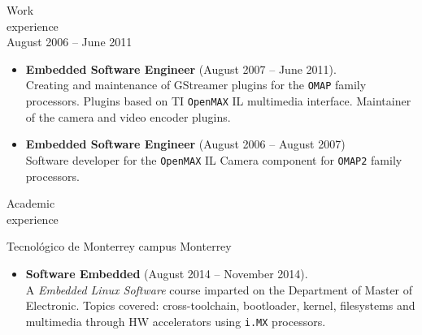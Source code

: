 \documentclass{resume}
\def\itesm{Tecnol\'ogico de Monterrey campus Monterrey}
\begin{document}
\begin{category}{Work \\experience}
\\
August 2006 -- June 2011
\begin{itemize}
\item \textbf{Embedded Software Engineer} (August 2007 -- June 2011).\\
  Creating and maintenance of GStreamer plugins for the \texttt{OMAP} family
  processors. Plugins based on TI \texttt{OpenMAX} IL multimedia interface.
  Maintainer of the camera and video encoder plugins.
\item \textbf{Embedded Software Engineer} (August 2006 -- August 2007)\\
  Software developer for the \texttt{OpenMAX} IL Camera component for
  \texttt{OMAP2} family processors.
\end{itemize}
\end{category}

\begin{category}{Academic \\experience}

\citem\itesm\\
\begin{itemize}
\item \textbf{Software Embedded} (August 2014 -- November 2014).\\
  A \textit{Embedded Linux Software} course imparted on the Department of
  Master of Electronic. Topics covered: cross-toolchain, bootloader,
  kernel, filesystems and multimedia through HW accelerators using
  \texttt{i.MX} processors.
\end{itemize}
\end{category}
\end{document}
